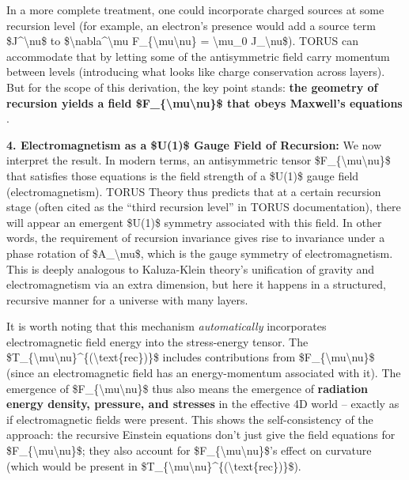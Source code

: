In a more complete treatment, one could incorporate charged sources at
some recursion level (for example, an electron's presence would add a
source term \$J\^{}\textbackslash{}nu\$ to
\$\textbackslash{}nabla\^{}\textbackslash{}mu
F\_\{\textbackslash{}mu\textbackslash{}nu\} = \textbackslash{}mu\_0
J\_\textbackslash{}nu\$). TORUS can accommodate that by letting some of
the antisymmetric field carry momentum between levels (introducing what
looks like charge conservation across layers). But for the scope of this
derivation, the key point stands: \textbf{the geometry of recursion
yields a field \$F\_\{\textbackslash{}mu\textbackslash{}nu\}\$ that
obeys Maxwell's equations}​.

\textbf{4. Electromagnetism as a \$U(1)\$ Gauge Field of Recursion:} We
now interpret the result. In modern terms, an antisymmetric tensor
\$F\_\{\textbackslash{}mu\textbackslash{}nu\}\$ that satisfies those
equations is the field strength of a \$U(1)\$ gauge field
(electromagnetism). TORUS Theory thus predicts that at a certain
recursion stage (often cited as the ``third recursion level'' in TORUS
documentation), there will appear an emergent \$U(1)\$ symmetry
associated with this field​. In other words, the requirement of
recursion invariance gives rise to invariance under a phase rotation of
\$A\_\textbackslash{}mu\$, which is the gauge symmetry of
electromagnetism. This is deeply analogous to Kaluza-Klein theory's
unification of gravity and electromagnetism via an extra dimension, but
here it happens in a structured, recursive manner for a universe with
many layers.

It is worth noting that this mechanism \emph{automatically} incorporates
electromagnetic field energy into the stress-energy tensor. The
\$T\_\{\textbackslash{}mu\textbackslash{}nu\}\^{}\{(\textbackslash{}text\{rec\})\}\$
includes contributions from
\$F\_\{\textbackslash{}mu\textbackslash{}nu\}\$ (since an
electromagnetic field has an energy-momentum associated with it). The
emergence of \$F\_\{\textbackslash{}mu\textbackslash{}nu\}\$ thus also
means the emergence of \textbf{radiation energy density, pressure, and
stresses} in the effective 4D world -- exactly as if electromagnetic
fields were present. This shows the self-consistency of the approach:
the recursive Einstein equations don't just give the field equations for
\$F\_\{\textbackslash{}mu\textbackslash{}nu\}\$; they also account for
\$F\_\{\textbackslash{}mu\textbackslash{}nu\}\$'s effect on curvature
(which would be present in
\$T\_\{\textbackslash{}mu\textbackslash{}nu\}\^{}\{(\textbackslash{}text\{rec\})\}\$).

